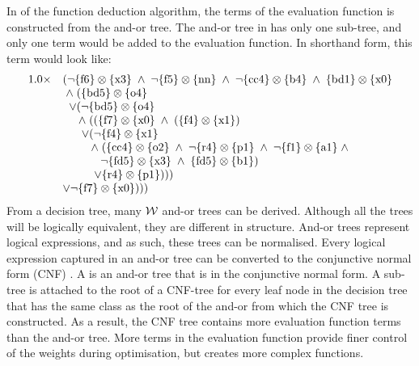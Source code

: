 In  of the function deduction algorithm, the terms of the evaluation function is constructed from the and-or tree.   The and-or tree in  has only one sub-tree, and only one term would be added to the evaluation function.  In shorthand form, this term would look like:
\[
\begin{array}{ll}
 1.0 \times &
( 
\neg  \{ \mbox{f6} \} \otimes \{ \mbox{x3} \} 
\;\wedge\; \neg \{ \mbox{f5} \} \otimes \{ \mbox{nn} \} 
\;\wedge\; \neg \{ \mbox{cc4} \} \otimes \{ \mbox{b4} \} 
\;\wedge\; \{ \mbox{bd1} \} \otimes \{ \mbox{x0} \} 
\\ &  \;\wedge\; 
	( \{ \mbox{bd5} \} \otimes \{ \mbox{o4} \} 
\\ & \;\;	\vee	
		( \neg \{ \mbox{bd5} \} \otimes \{ \mbox{o4} \} 
\\ &	\;\; \;\;	\;\wedge\; 	( 
				(\{ \mbox{f7} \} \otimes \{ \mbox{x0} \} 
				\;\wedge\; 
					(\{ \mbox{f4} \} \otimes \{ \mbox{x1} \}) 
\\ &	\;\; \;\;	 \;\;			\vee 
					( \neg \{ \mbox{f4} \} \otimes \{ \mbox{x1} \} 
\\ &	\;\; \;\;	 \;\;	\;\;	\;\wedge\; 
							(\{ \mbox{cc4} \} \otimes \{ \mbox{o2} \} 
							\;\wedge\; \neg \{ \mbox{r4} \} \otimes \{ \mbox{p1} \} 
							\;\wedge\; \neg \{ \mbox{f1} \} \otimes \{ \mbox{a1} \}  
							\;\wedge\; 
\\ &	\;\; \;\;	 \;\;	\;\; \;\; \;\;	\neg \{ \mbox{fd5} \} \otimes \{ \mbox{x3} \} 
							\;\wedge\; \{ \mbox{fd5} \} \otimes \{ \mbox{b1} \}
							) 
\\ &	\;\; \;\;	 \;\;	\;\; \;\;	\vee \{ \mbox{r4} \} \otimes \{ \mbox{p1} \}))) 
\\ \;\; &	\vee  
			 \neg \{ \mbox{f7} \} \otimes \{ \mbox{x0} \}
		)))\\
\end{array}
\]				
From a decision tree, many ${\mathcal W}$ and-or trees can be derived.  Although all the trees will be logically equivalent, they are different in structure.  And-or trees represent logical expressions, and as such, these trees can be normalised.  Every logical expression captured in an and-or tree can be converted to the conjunctive normal form (CNF) \cite{hamilton88}. A  is an and-or tree that is in the conjunctive normal form.  A sub-tree is attached to the root of a CNF-tree for every leaf node in the decision tree that has the same class as the root of the and-or from which the CNF tree is constructed. As a  result, the CNF tree contains more evaluation function terms than the and-or tree. More terms in the evaluation function provide finer control of the weights during optimisation,  but creates more complex functions. 
